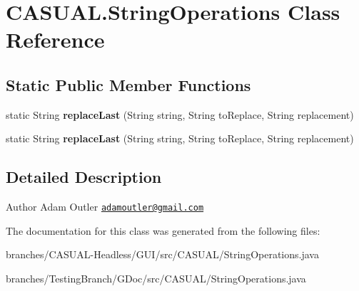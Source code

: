 \hypertarget{classCASUAL_1_1StringOperations}{\section{C\-A\-S\-U\-A\-L.\-String\-Operations Class Reference}
\label{classCASUAL_1_1StringOperations}
}
\subsection*{Static Public Member Functions}
\begin{DoxyCompactItemize}
\item 
\hypertarget{classCASUAL_1_1StringOperations_a292a8206afc5022fed42836adc703d46}{static String {\bfseries replace\-Last} (String string, String to\-Replace, String replacement)}\label{classCASUAL_1_1StringOperations_a292a8206afc5022fed42836adc703d46}

\item 
\hypertarget{classCASUAL_1_1StringOperations_a292a8206afc5022fed42836adc703d46}{static String {\bfseries replace\-Last} (String string, String to\-Replace, String replacement)}\label{classCASUAL_1_1StringOperations_a292a8206afc5022fed42836adc703d46}

\end{DoxyCompactItemize}


\subsection{Detailed Description}
\begin{DoxyAuthor}{Author}
Adam Outler \href{mailto:adamoutler@gmail.com}{\tt adamoutler@gmail.\-com} 
\end{DoxyAuthor}


The documentation for this class was generated from the following files\-:\begin{DoxyCompactItemize}
\item 
branches/\-C\-A\-S\-U\-A\-L-\/\-Headless/\-G\-U\-I/src/\-C\-A\-S\-U\-A\-L/String\-Operations.\-java\item 
branches/\-Testing\-Branch/\-G\-Doc/src/\-C\-A\-S\-U\-A\-L/String\-Operations.\-java\end{DoxyCompactItemize}
